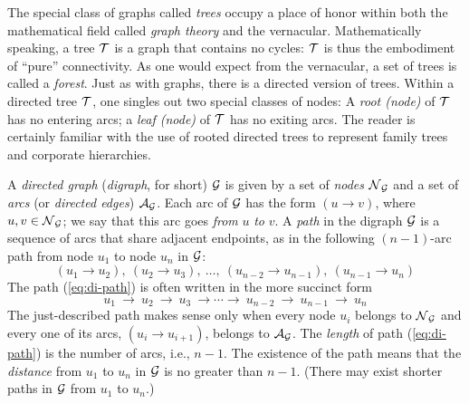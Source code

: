 The special class of graphs called {\it trees} 
 occupy a place of honor within both the mathematical
field called {\it graph theory} and the vernacular.  Mathematically
speaking, a tree $\mbox{$\cal T$}$ is a graph that contains no cycles: $\mbox{$\cal T$}$ is thus
the embodiment of ``pure'' connectivity.  As one would expect from the
vernacular, a set of trees is called a {\it forest}.  Just as with graphs, there is a directed version of trees.
Within a directed tree $\mbox{$\cal T$}$, one singles out two special classes of
nodes: A {\it root (node)}   of $\mbox{$\cal T$}$ has no entering arcs; a {\it leaf (node)}
  of $\mbox{$\cal T$}$
has no exiting arcs.  The reader is certainly familiar with the use of
rooted directed trees to represent family trees and corporate
hierarchies.



A {\it directed graph}  ({\it digraph},
 for short) $\mbox{$\cal G$}$ is given by a set of {\it nodes}
$\mbox{$\cal N$}_{\mbox{{\scriptsize $\cal G$}}}$ and a set of {\it arcs}
(or {\it directed edges}) $\mbox{$\cal A$}_{\mbox{{\scriptsize $\cal G$}}}$.
Each arc of $\mbox{$\cal G$}$ has the form $(u \rightarrow v)$,
where $u, v \in \mbox{$\cal N$}_{\mbox{{\scriptsize $\cal G$}}}$; we say that this arc goes {\em from} $u$
{\em to} $v$.  A {\it path} 
in the digraph $\mbox{$\cal G$}$ is a sequence of arcs that share adjacent
endpoints, as in the following $(n-1)$-arc path from node $u_1$ to
node $u_n$ in $\mbox{$\cal G$}$:
\begin{equation}
\label{eq:di-path}
(u_1 \rightarrow u_2), \ (u_2 \rightarrow u_3), \ \ldots, \ (u_{n-2}
        \rightarrow u_{n-1}), \ (u_{n-1} \rightarrow u_n)
\end{equation}
The path (\ref{eq:di-path}) is often written in the more succinct form
\[
u_1 \ \rightarrow \ u_2 \ \rightarrow \ u_3 \ \rightarrow \cdots
\rightarrow \ u_{n-2} \ \rightarrow \ u_{n-1} \ \rightarrow \ u_n
\]
The just-described path makes sense only when every node $u_i$ belongs
to $\mbox{$\cal N$}_{\mbox{{\scriptsize $\cal G$}}}$ and every one of its arcs, $(u_i \rightarrow u_{i+1})$,
belongs to $\mbox{$\cal A$}_{\mbox{{\scriptsize $\cal G$}}}$.  The {\it length} of path (\ref{eq:di-path}) is
the number of arcs, i.e., $n-1$.  The existence of the path means that
the {\it distance} 
  from
$u_1$ to $u_n$ in $\mbox{$\cal G$}$ is no greater than $n-1$.  (There may exist
shorter paths in $\mbox{$\cal G$}$ from $u_1$ to $u_n$.)

